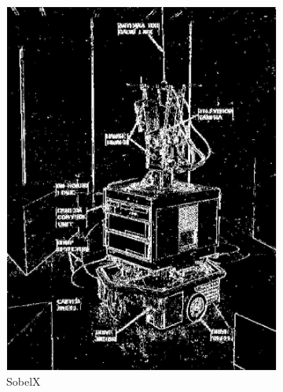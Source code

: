 \documentclass[lettersize,journal]{IEEEtran}
\begin{document}
\begin{figure}[h]
    \centering 
    \begin{subfigure}[h]{0.155\textwidth}
        \centering 
        \includegraphics[width=\linewidth]{sobelX_map}
        \caption{SobelX}  
    \end{subfigure}
    \begin{subfigure}[h]{0.155\textwidth}
        \centering 

\end{subfigure}
\end{figure}
\end{document}
